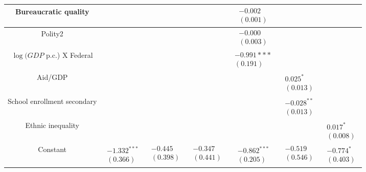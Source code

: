 \documentclass[10pt]{article}
\begin{document}
\begin{center}
\begin{tabular}{|c|c|c|c|c|c|c|}
\hline
Bureaucratic quality &  &  &  & $\begin{array}{l}-0.002 \\ (0.001)\end{array}$ &  &  \\
\hline
Polity2 &  &  &  & $\begin{array}{l}-0.000 \\ (0.003)\end{array}$ &  &  \\
\hline
$\log (G D P$ p.c.) X Federal &  &  &  & $\begin{array}{l}-0.991 * * * \\ (0.191)\end{array}$ &  &  \\
\hline
Aid/GDP &  &  &  &  & $\begin{array}{l}0.025^{*} \\ (0.013)\end{array}$ &  \\
\hline
School enrollment secondary &  &  &  &  & $\begin{array}{l}-0.028^{* *} \\ (0.013)\end{array}$ &  \\
\hline
Ethnic inequality &  &  &  &  &  & $\begin{array}{l}0.017^{*} \\ (0.008)\end{array}$ \\
\hline
Constant & $\begin{array}{l}-1.332^{* * *} \\ (0.366)\end{array}$ & $\begin{array}{l}-0.445 \\ (0.398)\end{array}$ & $\begin{array}{l}-0.347 \\ (0.441)\end{array}$ & $\begin{array}{l}-0.862^{* * *} \\ (0.205)\end{array}$ & $\begin{array}{l}-0.519 \\ (0.546)\end{array}$ & $\begin{array}{l}-0.774^{*} \\ (0.403)\end{array}$ \\

\end{tabular}
\end{center}
\end{document}
